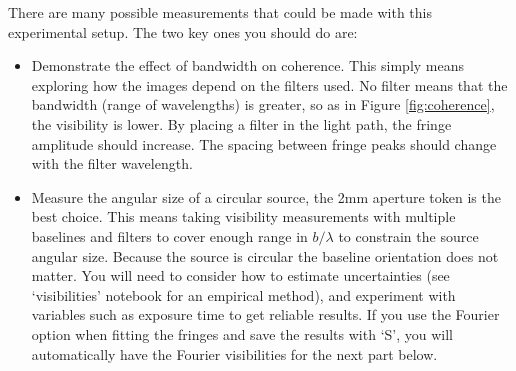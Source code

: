\documentclass[11pt]{article}
\begin{document}
There are many possible measurements that could be made with this experimental setup. The two key ones you should do are:
\begin{itemize}
    \item Demonstrate the effect of bandwidth on coherence. This simply means exploring how the images depend on the filters used. No filter means that the bandwidth (range of wavelengths) is greater, so as in Figure \ref{fig:coherence}, the visibility is lower. By placing a filter in the light path, the fringe amplitude should increase. The spacing between fringe peaks should change with the filter wavelength.
    \item Measure the angular size of a circular source, the 2mm aperture token is the best choice. This means taking visibility measurements with multiple baselines and filters to cover enough range in $b/\lambda$ to constrain the source angular size. Because the source is circular the baseline orientation does not matter. You will need to consider how to estimate uncertainties (see `visibilities' notebook for an empirical method), and experiment with variables such as exposure time to get reliable results. If you use the Fourier option when fitting the fringes and save the results with `S', you will automatically have the Fourier visibilities for the next part below.
\end{itemize}
\end{document}

